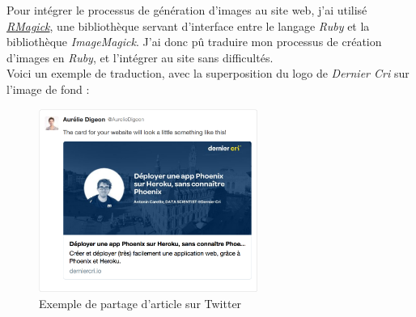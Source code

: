 \bigskip

Pour intégrer le processus de génération d'images au site web, j'ai
utilisé \href{https://github.com/rmagick/rmagick}{\emph{RMagick}}, une
bibliothèque servant d'interface entre le langage \emph{Ruby} et la
bibliothèque \emph{ImageMagick}. J'ai donc pû traduire mon processus de
création d'images en \emph{Ruby}, et l'intégrer au site sans
difficultés.\\
Voici un exemple de traduction, avec la superposition du logo de
\emph{Dernier Cri} sur l'image de fond :

\begin{Shaded}
\begin{Highlighting}[]
 \NormalTok{\textbackslash{}}
  \DataTypeTok{\textbackslash{}(}  \DataTypeTok{\textbackslash{})} \NormalTok{\textbackslash{}}
\end{Highlighting}
\end{Shaded}

\begin{Shaded}
\begin{Highlighting}[]
 
  \NormalTok{::}

    \NormalTok{::}\NormalTok{,}
    \NormalTok{,}
    \NormalTok{,}
    \NormalTok{::}
  \NormalTok{)}
\end{Highlighting}
\end{Shaded}

\begin{figure}[h]
  \centering
  \includegraphics[height=6cm]{figures/partage-blog.png}
  \caption{Exemple de partage d'article sur Twitter}
\end{figure}

